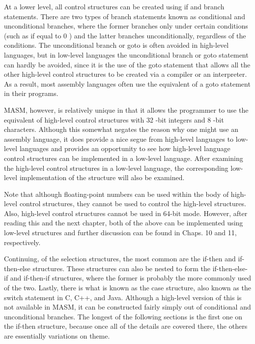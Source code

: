 \documentclass[10pt]{book}
\begin{document}
At a lower level, all control structures can be created using if and branch statements. There are two types of branch statements known as conditional and unconditional branches, where the former branches only under certain conditions (such as if equal to 0 ) and the latter branches unconditionally, regardless of the conditions. The unconditional branch or goto is often avoided in high-level languages, but in low-level languages the unconditional branch or goto statement can hardly be avoided, since it is the use of the goto statement that allows all the other high-level control structures to be created via a compiler or an interpreter. As a result, most assembly languages often use the equivalent of a goto statement in their programs.

MASM, however, is relatively unique in that it allows the programmer to use the equivalent of high-level control structures with 32 -bit integers and 8 -bit characters. Although this somewhat negates the reason why one might use an assembly language, it does provide a nice segue from high-level languages to low-level languages and provides an opportunity to see how high-level language control structures can be implemented in a low-level language. After examining the high-level control structures in a low-level language, the corresponding low-level implementation of the structure will also be examined.

Note that although floating-point numbers can be used within the body of high-level control structures, they cannot be used to control the high-level structures. Also, high-level control structures cannot be used in 64-bit mode. However, after reading this and the next chapter, both of the above can be implemented using low-level structures and further discussion can be found in Chaps. 10 and 11, respectively.

Continuing, of the selection structures, the most common are the if-then and if-then-else structures. These structures can also be nested to form the if-then-else-if and if-then-if structures, where the former is probably the more commonly used of the two. Lastly, there is what is known as the case structure, also known as the switch statement in C, C++, and Java. Although a high-level version of this is not available in MASM, it can be constructed fairly simply out of conditional and unconditional branches. The longest of the following sections is the first one on the if-then structure, because once all of the details are covered there, the others are essentially variations on theme.
\end{document}

